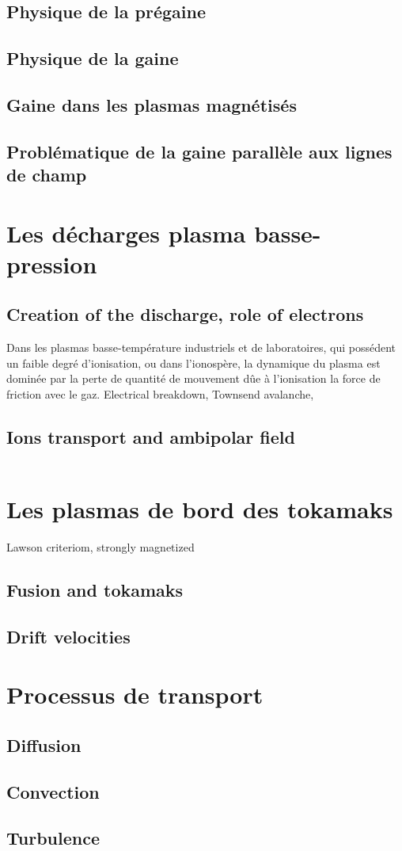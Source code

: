 			\subsection{Physique de la prégaine}
			\subsection{Physique de la gaine}
			\subsection{Gaine dans les plasmas magnétisés}
			\subsection{Problématique de la gaine parallèle aux lignes de champ}

	 \section{Les décharges plasma basse-pression}
		\subsection{Creation of the discharge, role of electrons}
		Dans les plasmas basse-température industriels et de laboratoires, qui possédent
			un faible degré d'ionisation, ou dans l'ionospère, la dynamique du plasma est dominée par
			la perte de quantité de mouvement dûe à l'ionisation la force de friction avec le gaz.
		Electrical breakdown, Townsend avalanche, 
		\subsection{Ions transport and ambipolar field}
		\begin{equation}
			\label{derivediffusion}
		\end{equation}
	\section{Les plasmas de bord des tokamaks}
		Lawson criteriom, strongly magnetized
		\subsection{Fusion and tokamaks}
		\subsection{Drift velocities}
	\section{Processus de transport}
		\subsection{Diffusion}
		\subsection{Convection}
		\subsection{Turbulence}
	

		